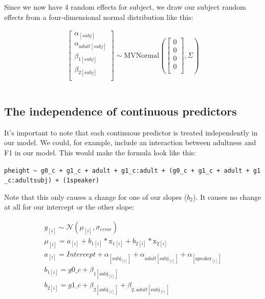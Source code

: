 \documentclass[
]{book}
\begin{document}
Since we now have 4 random effects for subject, we draw our subject random effects from a four-dimensional normal distribution like this:

\begin{equation}
\begin{split}
\begin{bmatrix} \alpha_{[subj]} \\ \alpha_{adult[subj]} \\ \beta_{1[subj]} \\ \beta_{2[subj]} \\ \end{bmatrix}  
\sim \mathrm{MVNormal} ( \begin{bmatrix} 0 \\ 0 \\ 0 \\ 0 \\ \end{bmatrix}, \Sigma) \\ \\
\end{split}
\label{eq:615}
\end{equation}

\hypertarget{the-independence-of-continuous-predictors}{%
\subsection{The independence of continuous predictors}\label{the-independence-of-continuous-predictors}}

It's important to note that each continuous predictor is treated independently in our model. We could, for example, include an interaction between adultness and F1 in our model. This would make the formula look like this:

\texttt{pheight\ \textasciitilde{}\ g0\_c\ +\ g1\_c\ +\ adult\ +\ g1\_c:adult\ +\ (g0\_c\ +\ g1\_c\ +\ adult\ +\ g1\_c:adult\textbar{}subj)\ +\ (1\textbar{}speaker)}

Note that this only causes a change for one of our slopes (\(b_2\)). It causes no change at all for our intercept or the other slope:

\begin{equation}
\begin{split}
y_{[i]} \sim \mathcal{N}(\mu_{[i]},\sigma_{error}) \\
\mu_{[i]} = a_{[i]} + b_{1[i]} * \mathrm{x}_{1[i]} + b_{2[i]} * \mathrm{x}_{2[i]}  \\ 
a_{[i]} = Intercept + \alpha_{[\mathrm{subj}_{[i]}]} + \alpha_{adult[\mathrm{subj}_{[i]}]} + \alpha_{[\mathrm{speaker}_{[i]}]}  \\
b_{1[i]} =  g0\_c + \beta_{1{[\mathrm{subj}_{[i]}]}} \\ 
b_{2[i]} =  g1\_c + \beta_{2{[\mathrm{subj}_{[i]}]}} + \beta_{2,adult[\mathrm{subj}_{[i]}]} \\ 
\end{split}
\label{eq:616}
\end{equation}
\end{document}
